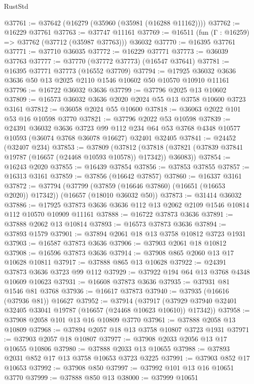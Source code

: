 \begin{lexlean}{RustStd}
\begin{coremodule}
@37761 := @37642 (@16279 (@35960 (@35981 (@16288 @11162))))
@37762 := @16229 @37761
@37763 := @37747 @11161
@37769 := @16511 (fun (Γ : @16259) => @37762 (@37712 (@35987 @37763))) @36032
@37770 := @16395 @37761
@37771 := @37710 @36035
@37772 := @16229 @37771
@37773 := @36039 @37763
@37777 := @37770 (@37772 @37773) (@16547 @37641)
@37781 := @16395 @37771 @37773 (@16552 @37709)
@37794 := @17925 @36032 @3636 @3636 @50 @13 @2025 @2110 @1546 @10602 @50 @10570 @10910 @11161
@37796 := @16722 @36032 @3636
@37799 := @37796 @2025 @13 @10602
@37809 := @16573 @36032 @3636 @2020 @2024 @55 @13 @3758 @10600 @3723 @3161
@37812 := @36058 @2024 @55 @10600
@37818 := @36063 @2022 @101 @53 @16 @10598 @3770
@37821 := @37796 @2022 @53 @10598
@37839 := @24391
    @36032
    @3636
    @3723
    @99
    @112
    @234
    @64
    @53
    @3768
    @4348
    @10577
    @10593
    (@36074 @3768 @36078 @16627)
    @32401
    @32405
@37841 := @24452 (@32407 @234)
@37853 := @37809
    (@37812 (@37818 (@37821 (@37839 @37841 @19787 (@16657 (@24468 @10593 @10578)) @17342)) @36083))
@37854 := @16243 @2020
@37855 := @16439 @37854
@37856 := @37853 @37855
@37857 := @16313 @3161
@37859 := @37856 (@16642 @37857)
@37860 := @16337 @3161
@37872 := @37794
    (@37799 (@37859 (@16646 @37860) (@16651 (@16653 @2020)) @17342))
    (@16657 (@18010 @36032 @50))
@37873 := @31414 @36032
@37886 := @17925 @37873 @3636 @3636 @112 @13 @2062 @2109 @1546 @10814 @112 @10570 @10909 @11161
@37888 := @16722 @37873 @3636
@37891 := @37888 @2062 @13 @10814
@37893 := @16573 @37873 @3636
@37894 := @37893 @1579
@37901 := @37894 @2061 @18 @13 @3758 @10812 @3723 @1931
@37903 := @16587 @37873 @3636
@37906 := @37903 @2061 @18 @10812
@37908 := @16596 @37873 @3636
@37914 := @37908 @865 @2060 @13 @17 @10628 @10811
@37917 := @37888 @865 @13 @10628
@37922 := @24391 @37873 @3636 @3723 @99 @112
@37929 := @37922 @194 @64 @13 @3768 @4348 @10609 @10623
@37931 := @16608 @37873 @3636
@37935 := @37931 @81 @1546 @81 @3768
@37936 := @16617 @37873
@37940 := @37935 (@16616 (@37936 @81)) @16627
@37952 := @37914
    (@37917 (@37929 @37940 @32401 @32405 @33041 @19787 (@16657 (@24468 @10623 @10610)) @17342))
@37958 := @37908 @2058 @101 @13 @16 @10809 @3770
@37961 := @37888 @2058 @13 @10809
@37968 := @37894 @2057 @18 @13 @3758 @10807 @3723 @1931
@37971 := @37903 @2057 @18 @10807
@37977 := @37908 @2033 @2056 @13 @17 @10655 @10806
@37980 := @37888 @2033 @13 @10655
@37988 := @37893 @2031 @852 @17 @13 @3758 @10653 @3723 @3225
@37991 := @37903 @852 @17 @10653
@37992 := @37908 @850
@37997 := @37992 @101 @13 @16 @10651 @3770
@37999 := @37888 @850 @13
@38000 := @37999 @10651

\end{coremodule}
\end{lexlean}
